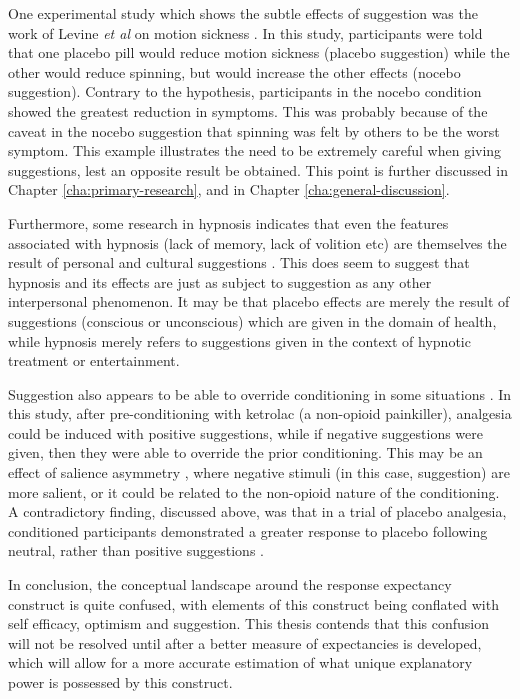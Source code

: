 One experimental study which shows the subtle effects of suggestion was the work of Levine \textit{et al}  on motion sickness \cite{Levine2006}.  In this study, participants were told that one placebo pill would reduce motion sickness (placebo suggestion) while the other would reduce spinning, but would increase the other effects (nocebo suggestion). Contrary to the hypothesis, participants in the nocebo condition showed the greatest reduction in symptoms. This was probably because of the caveat in the nocebo suggestion that spinning was felt by others to be the worst symptom. This example illustrates the need to be extremely careful when giving suggestions, lest an opposite result be obtained. This point is further discussed in Chapter \ref{cha:primary-research}, and in Chapter \ref{cha:general-discussion}. 

Furthermore, some research in hypnosis indicates that even the features associated with hypnosis (lack of memory, lack of volition etc) are themselves the result of personal and cultural suggestions \cite{Kirsch1999}. This does seem to suggest that hypnosis and its effects are just as subject to suggestion as any other interpersonal phenomenon.  It may be that placebo effects are merely the result of suggestions (conscious or unconscious) which are given in the domain of health, while hypnosis merely refers to suggestions given in the context of hypnotic treatment or entertainment. 

Suggestion also appears to be able to override conditioning in some situations \cite{Benedetti2008}. In this study, after pre-conditioning with ketrolac (a non-opioid painkiller), analgesia could be induced with positive suggestions, while if negative suggestions were given, then they were able to override the prior conditioning. This may be an effect of salience asymmetry \cite{Rothermund2004}, where negative stimuli (in this case, suggestion) are more salient, or it could be related to the non-opioid nature of the conditioning. A contradictory finding, discussed above, was that in a trial of placebo analgesia, conditioned participants demonstrated a greater response to placebo following neutral, rather than positive suggestions \cite{Klinger2007a}. 

In conclusion, the conceptual landscape around the response expectancy construct is quite confused, with elements of this construct being conflated with self efficacy, optimism and suggestion. This thesis contends that this confusion will not be resolved until after a better measure of expectancies is developed, which will allow for a more accurate estimation of what unique explanatory power is possessed by this construct. 

